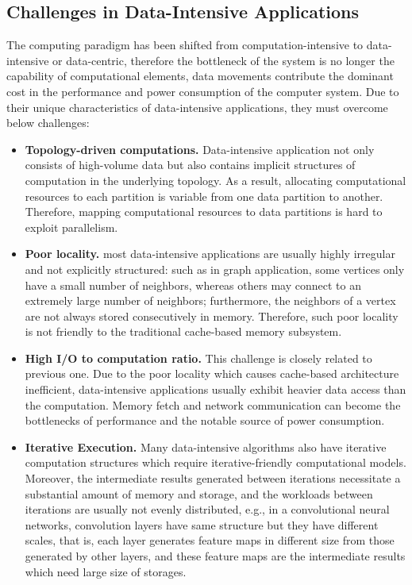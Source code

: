 \documentclass[letterpaper, 11pt, conference, margin=1in]{ieeeconf}   %
\begin{document}
\subsection{\bf Challenges in Data-Intensive Applications}
The computing paradigm has been shifted from computation-intensive to data-intensive or data-centric, therefore the bottleneck of the system is no longer the capability of computational elements, data movements contribute the dominant cost in the performance and power consumption of the computer system. Due to their unique characteristics of data-intensive applications, they must overcome below challenges:
\begin{itemize}
  \item \textbf{Topology-driven computations.} Data-intensive application not only consists of high-volume data but also contains implicit structures of computation in the underlying topology. As a result, allocating computational resources to each partition is variable from one data partition to another. Therefore, mapping computational resources to data partitions is hard to exploit parallelism.
  \item \textbf{Poor locality.} most data-intensive applications are usually highly irregular and not explicitly structured: such as in graph application, some vertices only have a small number of neighbors, whereas others may connect to an extremely large number of neighbors; furthermore, the neighbors of a vertex are not always stored consecutively in memory. Therefore, such poor locality is not friendly to the traditional cache-based memory subsystem.
  \item \textbf{High I/O to computation ratio.} This challenge is closely related to previous one. Due to the poor locality which causes cache-based architecture inefficient, data-intensive applications usually exhibit heavier data access than the computation. Memory fetch and network communication can become the bottlenecks of performance and the notable source of power consumption.
  \item \textbf{Iterative Execution.} Many data-intensive algorithms also have iterative computation structures which require iterative-friendly computational models. Moreover, the intermediate results generated between iterations necessitate a substantial amount of memory and storage, and the workloads between iterations are usually not evenly distributed, e.g., in a convolutional neural networks, convolution layers have same structure but they have different scales, that is, each layer generates feature maps in different size from those generated by other layers, and these feature maps are the intermediate results which need large size of storages.
\end{itemize}
\end{document}
